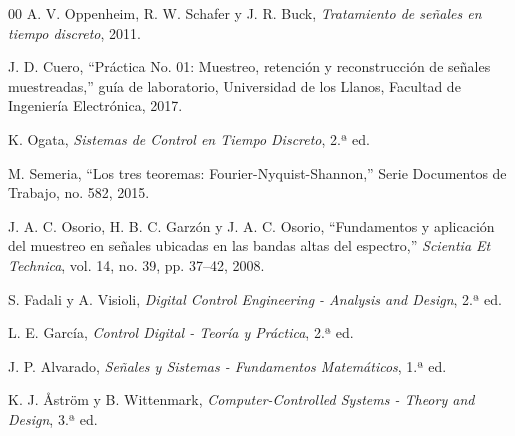 \documentclass[conference]{IEEEtran}
\begin{document}
\begin{thebibliography}{00}
A. V. Oppenheim, R. W. Schafer y J. R. Buck,
\textit{Tratamiento de señales en tiempo discreto}, 2011.

J. D. Cuero,
``Práctica No. 01: Muestreo, retención y reconstrucción de señales muestreadas,''
guía de laboratorio, Universidad de los Llanos, Facultad de Ingeniería Electrónica, 2017.

K. Ogata,
\textit{Sistemas de Control en Tiempo Discreto}, 2.ª ed.

M. Semeria,
``Los tres teoremas: Fourier-Nyquist-Shannon,''
Serie Documentos de Trabajo, no. 582, 2015.

J. A. C. Osorio, H. B. C. Garzón y J. A. C. Osorio,
``Fundamentos y aplicación del muestreo en señales ubicadas en las bandas altas del espectro,''
\textit{Scientia Et Technica}, vol. 14, no. 39, pp. 37--42, 2008.

S. Fadali y A. Visioli,
\textit{Digital Control Engineering - Analysis and Design}, 2.ª ed.

L. E. García,
\textit{Control Digital - Teoría y Práctica}, 2.ª ed.

J. P. Alvarado,
\textit{Señales y Sistemas - Fundamentos Matemáticos}, 1.ª ed.

K. J. Åström y B. Wittenmark,
\textit{Computer-Controlled Systems - Theory and Design}, 3.ª ed.

\end{thebibliography}
\end{document}
